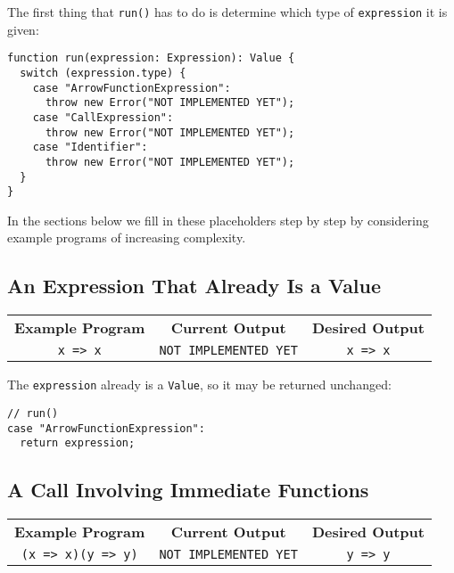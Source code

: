 \documentclass[12pt, oneside]{book}
\begin{document}
The first thing that \texttt{run()} has to do is determine which type of \texttt{expression} it is given:

\begin{verbatim}
function run(expression: Expression): Value {
  switch (expression.type) {
    case "ArrowFunctionExpression":
      throw new Error("NOT IMPLEMENTED YET");
    case "CallExpression":
      throw new Error("NOT IMPLEMENTED YET");
    case "Identifier":
      throw new Error("NOT IMPLEMENTED YET");
  }
}
\end{verbatim}

In the sections below we fill in these placeholders step by step by considering example programs of increasing complexity.

\subsection{An Expression That Already Is a Value}
\label{An Expression That Already Is a Value}

\begin{center}
\begin{tabular}{c|c|c}
\textbf{Example Program} & \textbf{Current Output} & \textbf{Desired Output} \\
\texttt{x => x} & \texttt{NOT IMPLEMENTED YET} & \texttt{x => x} \\
\end{tabular}
\end{center}

\noindent The \texttt{expression} already is a \texttt{Value}, so it may be returned unchanged:

\begin{verbatim}
// run()
case "ArrowFunctionExpression":
  return expression;
\end{verbatim}

\subsection{A Call Involving Immediate Functions}
\label{A Call Involving Immediate Functions}

\begin{center}
\begin{tabular}{c|c|c}
\textbf{Example Program} & \textbf{Current Output} & \textbf{Desired Output} \\
\texttt{(x => x)(y => y)} & \texttt{NOT IMPLEMENTED YET} & \texttt{y => y} \\
\end{tabular}
\end{center}
\end{document}
